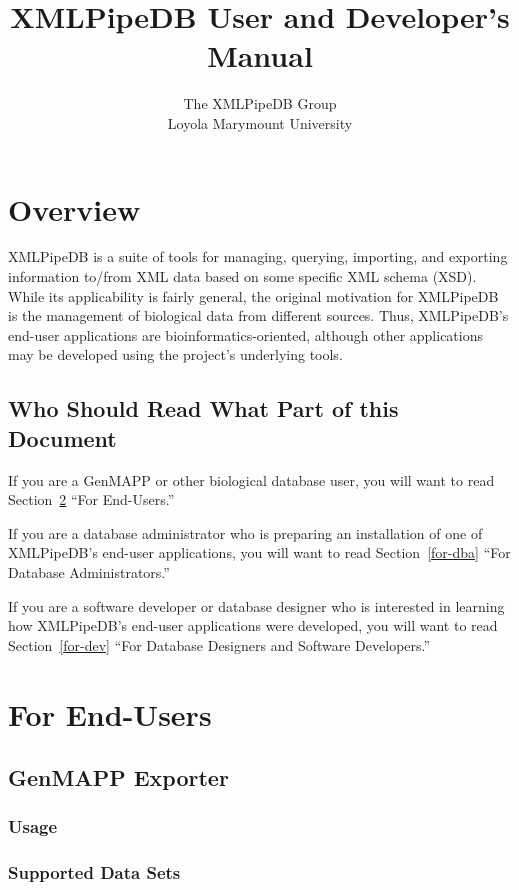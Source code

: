 \documentclass[11pt]{article}
\title{XMLPipeDB User and Developer's Manual}
\author{The XMLPipeDB Group\\
Loyola Marymount University
}
\begin{document}
\maketitle

\section{Overview}

XMLPipeDB is a suite of tools for managing, querying, importing, and exporting information to/from XML data based on some specific XML schema (XSD).  While its applicability is fairly general, the original motivation for XMLPipeDB is the management of biological data from different sources.  Thus, XMLPipeDB's end-user applications are bioinformatics-oriented, although other applications may be developed using the project's underlying tools.

\subsection{Who Should Read What Part of this Document}

If you are a GenMAPP or other biological database user, you will want to read Section~\ref{for-end-users} ``For End-Users.''

If you are a database administrator who is preparing an installation of one of XMLPipeDB's end-user applications, you will want to read Section~\ref{for-dba} ``For Database Administrators.''

If you are a software developer or database designer who is interested in learning how XMLPipeDB's end-user applications were developed, you will want to read Section~\ref{for-dev} ``For Database Designers and Software Developers.''

\section{For End-Users}
\label{for-end-users}

\subsection{GenMAPP Exporter}

\subsubsection{Usage}

\subsubsection{Supported Data Sets}
\label{supportedDataSets}
\end{document}
